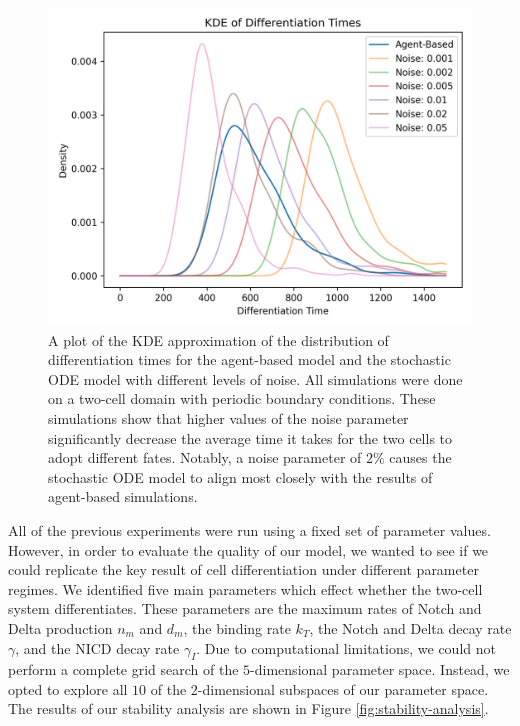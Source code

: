 \documentclass{article}
\begin{document}
\begin{flushleft}
\begin{figure}[!htp]
  \includegraphics[width=\textwidth]{img/vis11_V2.png}
  \caption{A plot of the KDE approximation of the distribution of differentiation times for the agent-based model and the stochastic ODE model with different levels of noise. All simulations were done on a two-cell domain with periodic boundary conditions. These simulations show that higher values of the noise parameter significantly decrease the average time it takes for the two cells to adopt different fates. Notably, a noise parameter of $2\%$ causes the stochastic ODE model to align most closely with the results of agent-based simulations. }
  \label{fig:noise-estimate}
\end{figure}

\medskip

All of the previous experiments were run using a fixed set of parameter values.
However, in order to evaluate the quality of our model, we wanted to see if we could replicate the key result of cell differentiation under different parameter regimes.
We identified five main parameters which effect whether the two-cell system differentiates.
These parameters are the maximum rates of Notch and Delta production $n_{m}$ and $d_{m}$, the binding rate $k_{T}$, the Notch and Delta decay rate $\gamma$, and the NICD decay rate $\gamma_{I}$.
Due to computational limitations, we could not perform a complete grid search of the $5$-dimensional parameter space.
Instead, we opted to explore all $10$ of the $2$-dimensional subspaces of our parameter space.
The results of our stability analysis are shown in Figure \ref{fig:stability-analysis}.


\end{flushleft}
\end{document}
